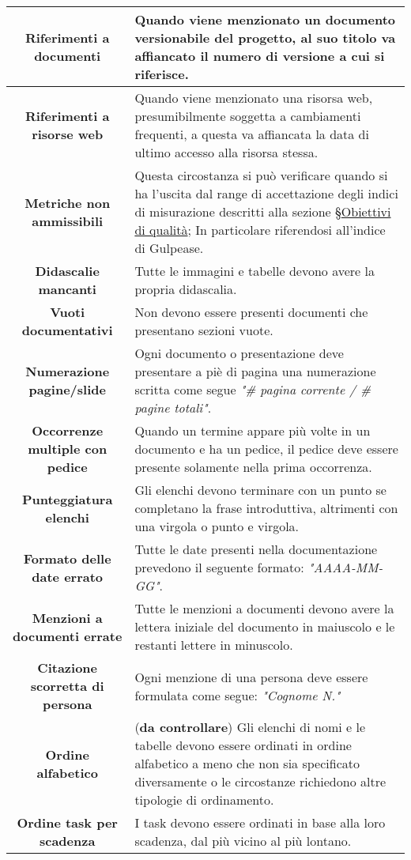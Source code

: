 {{{{{{{{{\begin{table}[H]
\begin{xltabular}{\textwidth}{c|X}
\endlastfoot

\hline
\textbf{Riferimenti a documenti} &  Quando viene menzionato un documento versionabile del progetto, al suo titolo va affiancato il numero di versione a cui si riferisce.\\
\hline
\textbf{Riferimenti a risorse web} &  Quando viene menzionato una risorsa web, presumibilmente soggetta a cambiamenti frequenti, a questa va affiancata la data di ultimo accesso alla risorsa stessa.\\
\hline
\textbf{Metriche non ammissibili} & Questa circostanza si può verificare quando si ha l’uscita dal range di accettazione degli indici di misurazione descritti alla sezione \S \hyperref[ObiettiviQualità]{Obiettivi di qualità}; In particolare riferendosi all'indice di Gulpease.\\
\hline
\textbf{Didascalie mancanti} & Tutte le immagini e tabelle devono avere la propria didascalia.\\
\hline
\textbf{Vuoti documentativi} & Non devono essere presenti documenti che presentano sezioni vuote.\\

\hline
\textbf{Numerazione pagine/slide} & Ogni documento o presentazione deve presentare a piè di pagina una numerazione scritta come segue \textit{"\# pagina corrente / \# pagine totali"}.\\
\hline
\textbf{Occorrenze multiple con pedice} & Quando un termine appare più volte in un documento e ha un pedice, il pedice deve essere presente solamente nella prima occorrenza.\\
\hline
\textbf{Punteggiatura elenchi} & Gli elenchi devono terminare con un punto se completano la frase introduttiva, altrimenti con una virgola o punto e virgola.\\
\hline
\textbf{Formato delle date errato} & Tutte le date presenti nella documentazione prevedono il seguente formato: \textit{"AAAA-MM-GG"}.\\
\hline
\textbf{Menzioni a documenti errate} & Tutte le menzioni a documenti devono avere la lettera iniziale del documento in maiuscolo e le restanti lettere in minuscolo.\\
\hline
\textbf{Citazione scorretta di persona }& Ogni menzione di una persona deve essere formulata come segue: \textit{"Cognome N."} \\

\hline
\textbf{Ordine alfabetico} & (\textbf{da controllare}) Gli elenchi di nomi e le tabelle devono essere ordinati in ordine alfabetico a meno che non sia specificato diversamente o le circostanze richiedono altre tipologie di ordinamento.\\
\hline
\textbf{Ordine task per scadenza} & I task devono essere ordinati in base alla loro scadenza, dal più vicino al più lontano.\\


\end{xltabular}
\end{table}}}}}}}}}}
